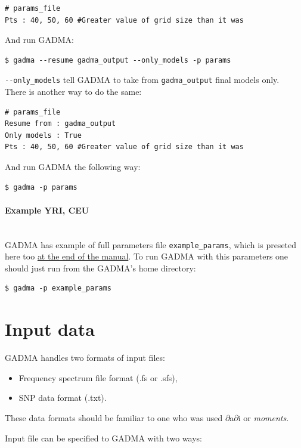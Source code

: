 \documentclass[12pt]{article}
\makeatletter
\newcommand{\dadi}{$\partial$a$\partial$i\xspace}
\newcommand{\moments}{\textit{moments}\xspace}
\newcommand{\py}[1]{\lstinline[language=Python, showstringspaces=False]@#1@}
\makeatother
\begin{document}
\begin{lstlisting}
# params_file
Pts : 40, 50, 60 #Greater value of grid size than it was
\end{lstlisting}

And run GADMA:
\begin{lstlisting}
$ gadma --resume gadma_output --only_models -p params 
\end{lstlisting}

\py{--only_models} tell GADMA to take from \py{gadma_output} final models only. \\

There is another way to do the same:
\begin{lstlisting}
# params_file
Resume from : gadma_output
Only models : True
Pts : 40, 50, 60 #Greater value of grid size than it was
\end{lstlisting}

And run GADMA the following way:
\begin{lstlisting}
$ gadma -p params
\end{lstlisting}

\paragraph{Example YRI, CEU}\mbox{}\\
GADMA has example of full parameters file \py{example_params}, which is preseted here too \hyperref[sec:example-params]{at the end of the manual}. To run GADMA with this parameters one should just run from the GADMA's home directory:
\begin{lstlisting}
$ gadma -p example_params
\end{lstlisting}


\section{Input data}

GADMA handles two formats of input files:
\begin{itemize}
    \item Frequency spectrum file format (.fs or .sfs),
    \item SNP data format (.txt).
\end{itemize}

These data formats should be familiar to one who was used \dadi or \moments.

Input file can be specified to GADMA with two ways:
\end{document}
